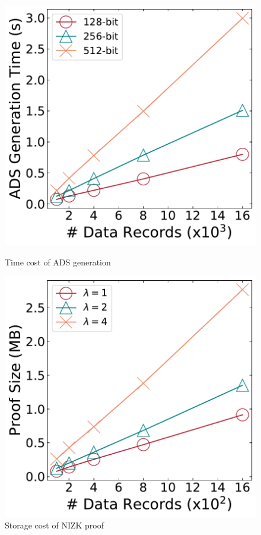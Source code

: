 \documentclass[11pt,divpdfm]{article}
\begin{document}
\begin{figure}[t]
	\centering %
	\begin{minipage}[b]{0.4\textwidth} %
		\centering %
		\includegraphics[width=1\textwidth]{figs/Result_ADS.pdf} %
		\caption{Time cost of ADS generation}
		\label{fig:ResultADS}
	\end{minipage}
	\begin{minipage}[b]{0.4\textwidth} %
		\centering %
		\includegraphics[width=1\textwidth]{figs/Result_ProofSize.pdf}%
		\caption{Storage cost of NIZK proof}
		\label{fig:ResultProofSize}
	\end{minipage}
\end{figure}
\end{document}
